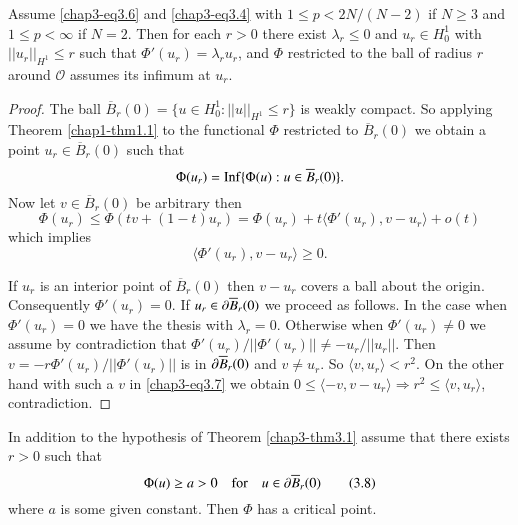 \begin{theorem}\label{chap3-thm3.1}
Assume \eqref{chap3-eq3.6} and \eqref{chap3-eq3.4} with $1\leq
p<2N/(N-2)$ if $N\geq 3$ and $1\leq p<\infty$ if $N=2$. Then for each
$r>0$ there exist $\lambda_{r}\leq 0$ and $u_{r}\in H^{1}_{0}$ with
$||u_{r}||_{H^{1}}\leq r$ such that $\Phi'(u_{r})=\lambda_{r}u_{r}$,
and $\Phi$ restricted to the ball of radius $r$ around $\mathcal{O}$
assumes its infimum at $u_{r}$. 
\end{theorem}

\begin{proof}
The ball $\overline{B}_{r}(0)=\{u\in H^{1}_{0}:||u||_{H^{1}}\leq r\}$
is weakly compact. So applying Theorem \ref{chap1-thm1.1} to the
functional $\Phi$ restricted to $\overline{B}_{r}(0)$ we obtain a
point $u_{r}\in \overline{B}_{r}(0)$ such that
$$
\Phi(u_{r})=\operatorname{Inf}\{\Phi(u):u\in \overline{B}_{r}(0)\}.
$$
Now let $v\in \overline{B}_{r}(0)$ be arbitrary then
$$
\Phi(u_{r})\leq \Phi(tv+(1-t)u_{r})=\Phi(u_{r})+t\langle
\Phi'(u_{r}),v-u_{r}\rangle +o(t)
$$
which implies
\begin{equation*}
\langle \Phi'(u_{r}),v-u_{r}\rangle \geq 0.\tag{3.7}\label{chap3-eq3.7}
\end{equation*}

If $u_{r}$ is an interior point of $\overline{B}_{r}(0)$ then
$v-u_{r}$ covers a ball about the origin. Consequently
$\Phi'(u_{r})=0$. If $u_{r}\in \partial \overline{B}_{r}(0)$ we proceed as
follows. In the case when $\Phi'(u_{r})=0$ we have the thesis with
$\lambda_{r}=0$. Otherwise when $\Phi'(u_{r})\neq 0$ we assume by
contradiction that $\Phi'(u_{r})/||\Phi'(u_{r})||\neq
-u_{r}/||u_{r}||$. Then $v=-r\Phi'(u_{r})/||\Phi'(u_{r})||$ is in $\partial
\overline{B}_{r}(0)$ and $v\neq u_{r}$. So $\langle
v,u_{r}\rangle<r^{2}$. On the other hand with such a $v$ in
\eqref{chap3-eq3.7} we obtain $0\leq \langle
-v,v-u_{r}\rangle\Rightarrow r^{2}\leq \langle v,u_{r}\rangle$,
contradiction. 
\end{proof}

\begin{corollary}\label{chap3-coro3.2}
In addition to the hypothesis of Theorem \ref{chap3-thm3.1} assume
that there exists $r>0$ such that
\begin{equation*}
\Phi(u)\geq a>0\quad\text{for}\quad u\in \partial
\overline{B}_{r}(0)\tag{3.8}\label{chap3-eq3.8} 
\end{equation*}
where $a$ is some given constant. Then $\Phi$ has a critical point.
\end{corollary}

